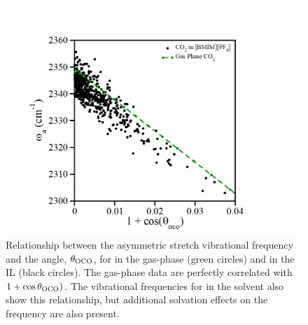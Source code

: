 \documentclass[%
  class = book,%
  crop = false,%
  float = true,%
  multi = true,%
  preview = false,%
]{standalone}
\begin{document}
\begin{figure}
  \centering
  \includegraphics[width=\textwidth]{figure1.png}
  \caption[Relationship between  \(\tilde{\nu}_{3}\) and \(1 + \cos{\theta_{\ce{OCO}}}\)]{Relationship between the  asymmetric stretch vibrational frequency and the  angle, \(\theta_{\ce{OCO}}\), for  in the gas-phase (green circles) and in the \ce{[C4C1im][PF6]} IL (black circles). The gas-phase data are perfectly correlated with \(1 + \cos{\theta_{\ce{OCO}}})\). The vibrational frequencies for  in the \ce{[C4C1im][PF6]} solvent also show this relationship, but additional solvation effects on the frequency are also present.}
  \label{paper_03:fig1}
\end{figure}
\end{document}
